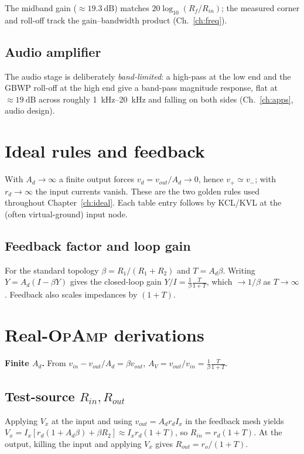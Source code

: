 \documentclass[11pt,a4paper,oneside]{book}
\newcommand{\Ad}{A_d}
\newcommand{\op}{\textsc{OpAmp}}
\begin{document}
The midband gain ($\approx\qty{19.3}{\dB}$) matches $20\log_{10}(R_f/R_{in})$; the
measured corner and roll-off track the gain--bandwidth product
(Ch.~\ref{ch:freq}).

\section{Audio amplifier}

The audio stage is deliberately \emph{band-limited}: a high-pass at the low end
and the GBWP roll-off at the high end give a band-pass magnitude response, flat at
$\approx\qty{19}{\dB}$ across roughly \qty{1}{\kilo\hertz}--\qty{20}{\kilo\hertz}
and falling on both sides (Ch.~\ref{ch:apps}, audio design).

\appendix
\chapter{Ideal rules and feedback}\label{app:idealrules}
With $\Ad\to\infty$ a finite output forces $v_d=v_{out}/\Ad\to0$, hence
$v_+\simeq v_-$; with $r_d\to\infty$ the input currents vanish. These are the two
golden rules used throughout Chapter~\ref{ch:ideal}. Each table entry follows by
KCL/KVL at the (often virtual-ground) input node.

\section{Feedback factor and loop gain}\label{app:feedback}
For the standard topology $\beta=R_1/(R_1+R_2)$ and $T=\Ad\beta$. Writing
$Y=\Ad(I-\beta Y)$ gives the closed-loop gain $Y/I=\frac1\beta\frac{T}{1+T}$,
which $\to1/\beta$ as $T\to\infty$. Feedback also scales impedances by $(1+T)$.

\chapter{Real-\op{} derivations}\label{app:finiteAd}
\textbf{Finite $\Ad$.} From $v_{in}-v_{out}/\Ad=\beta v_{out}$,
$A_V=v_{out}/v_{in}=\frac1\beta\frac{T}{1+T}$.

\section{Test-source $R_{in},R_{out}$}\label{app:rinrout}
Applying $V_x$ at the input and using $v_{out}=\Ad r_d I_x$ in the feedback mesh
yields $V_x=I_x[r_d(1+\Ad\beta)+\beta R_2]\approx I_x r_d(1+T)$, so
$R_{in}=r_d(1+T)$. At the output, killing the input and applying $V_x$ gives
$R_{out}=r_o/(1+T)$.
\end{document}
